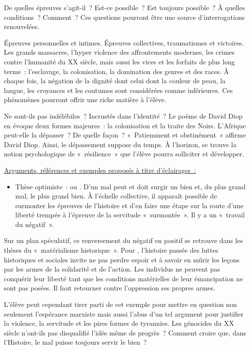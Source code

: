 {De quelles épreuves s'agit-il~? Est-ce possible~? Est toujours possible~? À quelles
conditions~? Comment~? Ces questions pourront être une source d'interrogations renouvelées.

Épreuves personnelles et intimes. Épreuves collectives, traumatismes et victoires. Les
grands massacres, l'hyper violence des affrontements modernes, les crimes contre l'humanité du
XX\ieme{} siècle, mais aussi les vices et les forfaits de plus long terme~: l'esclavage, la colonisation, la
domination des genres et des races. À chaque fois, la négation de la dignité dont celui dont la
couleur de peau, la langue, les croyances et les coutumes sont considérées comme inférieures. Ces
phénomènes pourront offrir une riche matière à l'élève.

Ne sont-ils pas indélébiles~? Incrustés dans l'identité~? Le poème de David Diop en évoque
deux formes majeures~: la colonisation et la traite des Noirs. L'Afrique peut-elle la dépasser~? De
quelle façon~? «~Patiemment et obstinément~» affirme David Diop. Ainsi, le dépassement suppose
du temps. À l'horizon, se trouve la notion psychologique de «~résilience~» que l'élève pourra
solliciter et développer.

\underline{Arguments, références et exemples proposés à titre d'éclairages~:}

\begin{itemize}
\item Thèse optimiste~:  ou . D'un mal peut et doit surgir un bien et, du plus grand
mal, le plus grand bien. À l'échelle collective, il apparaît possible de surmonter les épreuves de
l'histoire et d'en faire une étape sur la route d'une liberté trempée à l'épreuve de la servitude
«~surmontée~». Il y a un «~travail du négatif~».
\end{itemize}

Sur un plan spéculatif, ce renversement du négatif en positif se retrouve dans les thèses du
«~matérialisme historique~». Pour , l'histoire passée des luttes historiques et sociales invite
ne pas perdre espoir et à savoir en mûrir les leçons par les armes de la solidarité et de l'action. Les
individus ne peuvent pas conquérir leur liberté tant que les conditions matérielles de leur
émancipation ne sont pas posées. Il faut retourner contre l'oppression ses propres armes.

L'élève peut cependant tirer parti de cet exemple pour mettre en question non seulement
l'espérance marxiste mais aussi l'abus d'un tel argument pour justifier la violence, la servitude et
les pires formes de tyrannies. Les génocides du XX\ieme{} siècle n'ont-ils pas disqualifié l'idée même de
progrès~? Comment croire que, dans l'Histoire, le mal puisse toujours servir le bien~?

}
